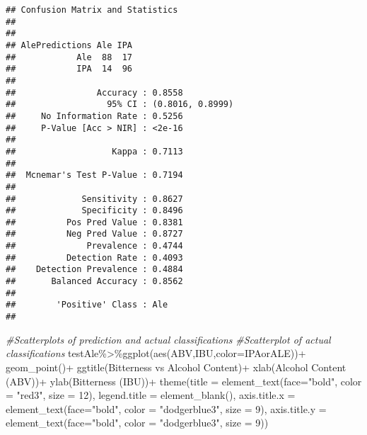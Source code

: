 \documentclass[
]{article}
\newenvironment{Shaded}{\begin{snugshade}}{\end{snugshade}}
\newcommand{\AttributeTok}[1]{\textcolor[rgb]{0.77,0.63,0.00}{#1}}
\newcommand{\CommentTok}[1]{\textcolor[rgb]{0.56,0.35,0.01}{\textit{#1}}}
\newcommand{\DecValTok}[1]{\textcolor[rgb]{0.00,0.00,0.81}{#1}}
\newcommand{\FunctionTok}[1]{\textcolor[rgb]{0.00,0.00,0.00}{#1}}
\newcommand{\NormalTok}[1]{#1}
\newcommand{\SpecialCharTok}[1]{\textcolor[rgb]{0.00,0.00,0.00}{#1}}
\newcommand{\StringTok}[1]{\textcolor[rgb]{0.31,0.60,0.02}{#1}}
\begin{document}
\begin{verbatim}
## Confusion Matrix and Statistics
## 
##               
## AlePredictions Ale IPA
##            Ale  88  17
##            IPA  14  96
##                                           
##                Accuracy : 0.8558          
##                  95% CI : (0.8016, 0.8999)
##     No Information Rate : 0.5256          
##     P-Value [Acc > NIR] : <2e-16          
##                                           
##                   Kappa : 0.7113          
##                                           
##  Mcnemar's Test P-Value : 0.7194          
##                                           
##             Sensitivity : 0.8627          
##             Specificity : 0.8496          
##          Pos Pred Value : 0.8381          
##          Neg Pred Value : 0.8727          
##              Prevalence : 0.4744          
##          Detection Rate : 0.4093          
##    Detection Prevalence : 0.4884          
##       Balanced Accuracy : 0.8562          
##                                           
##        'Positive' Class : Ale             
## 
\end{verbatim}

\begin{Shaded}
\begin{Highlighting}[]
\CommentTok{\#Scatterplots of prediction and actual classifications}
\CommentTok{\#Scatterplot of actual classifications}
\NormalTok{testAle}\SpecialCharTok{\%\textgreater{}\%}\FunctionTok{ggplot}\NormalTok{(}\FunctionTok{aes}\NormalTok{(ABV,IBU,}\AttributeTok{color=}\NormalTok{IPAorALE))}\SpecialCharTok{+}
  \FunctionTok{geom\_point}\NormalTok{()}\SpecialCharTok{+}
  \FunctionTok{ggtitle}\NormalTok{(}\StringTok{\textquotesingle{}Bitterness vs Alcohol Content\textquotesingle{}}\NormalTok{)}\SpecialCharTok{+}
  \FunctionTok{xlab}\NormalTok{(}\StringTok{\textquotesingle{}Alcohol Content (ABV)\textquotesingle{}}\NormalTok{)}\SpecialCharTok{+}
  \FunctionTok{ylab}\NormalTok{(}\StringTok{\textquotesingle{}Bitterness (IBU)\textquotesingle{}}\NormalTok{)}\SpecialCharTok{+}
  \FunctionTok{theme}\NormalTok{(}\AttributeTok{title =} \FunctionTok{element\_text}\NormalTok{(}\AttributeTok{face=}\StringTok{"bold"}\NormalTok{, }\AttributeTok{color =} \StringTok{"red3"}\NormalTok{, }\AttributeTok{size =} \DecValTok{12}\NormalTok{),}
        \AttributeTok{legend.title =} \FunctionTok{element\_blank}\NormalTok{(),}
        \AttributeTok{axis.title.x =} \FunctionTok{element\_text}\NormalTok{(}\AttributeTok{face=}\StringTok{"bold"}\NormalTok{, }\AttributeTok{color =} \StringTok{"dodgerblue3"}\NormalTok{, }\AttributeTok{size =} \DecValTok{9}\NormalTok{),}
        \AttributeTok{axis.title.y =} \FunctionTok{element\_text}\NormalTok{(}\AttributeTok{face=}\StringTok{"bold"}\NormalTok{, }\AttributeTok{color =} \StringTok{"dodgerblue3"}\NormalTok{, }\AttributeTok{size =} \DecValTok{9}\NormalTok{))}
\end{Highlighting}
\end{Shaded}
\end{document}
